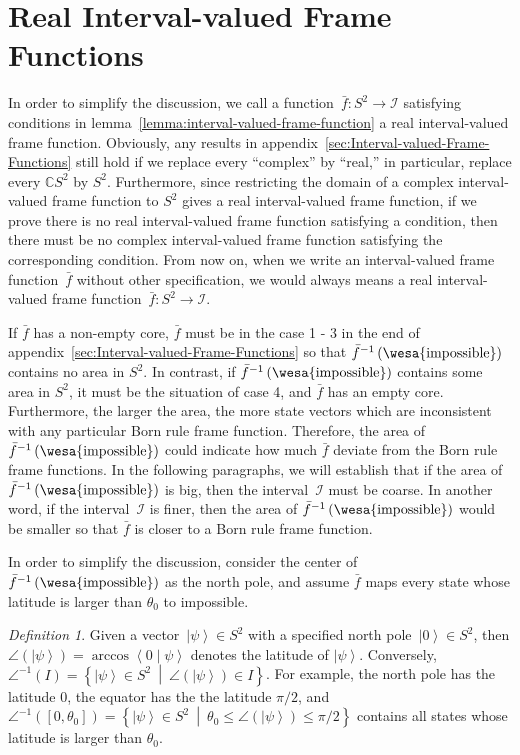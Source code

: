 \documentclass[12pt]{iopart}
\theoremstyle{remark}
\newtheorem{definition}{Definition}
\newcommand{\imposs}{{\mbox{\wesa{impossible}}}}
\newcommand{\ket}[1]{{\left\vert{#1}\right\rangle}}
\newcommand{\ip}[2]{\ensuremath{\left\langle{#1}\middle\vert{#2}\right\rangle}}
\newcommand{\set}[2]{\ensuremath{\left\{ {#1}~\middle|~{#2}\right\} }}
\begin{document}
\section{Real Interval-valued Frame Functions\label{sec:Real-Interval-valued-Frame}}

In order to simplify the discussion, we call a function~$\bar{f}:S^{2}\rightarrow\mathscr{I}$
satisfying conditions in lemma~\ref{lemma:interval-valued-frame-function}
a real interval-valued frame function. Obviously, any results in appendix~\ref{sec:Interval-valued-Frame-Functions}
still hold if we replace every ``complex'' by ``real,'' in particular,
replace every $\mathbb{C}S^{2}$ by $S^{2}$. Furthermore, since restricting
the domain of a complex interval-valued frame function to $S^{2}$
gives a real interval-valued frame function, if we prove there is
no real interval-valued frame function satisfying a condition, then
there must be no complex interval-valued frame function satisfying
the corresponding condition. From now on, when we write an interval-valued
frame function~$\bar{f}$ without other specification, we would always
means a real interval-valued frame function~$\bar{f}:S^{2}\rightarrow\mathscr{I}$.

If $\bar{f}$ has a non-empty core, $\bar{f}$ must be in the case
1 - 3 in the end of appendix~\ref{sec:Interval-valued-Frame-Functions}
so that $\bar{f}^{-1}\left(\imposs\right)$ contains no area in $S^{2}$.
In contrast, if $\bar{f}^{-1}\left(\imposs\right)$ contains some
area in $S^{2}$, it must be the situation of case 4, and $\bar{f}$
has an empty core. Furthermore, the larger the area, the more state
vectors which are inconsistent with any particular Born rule frame
function. Therefore, the area of $\bar{f}^{-1}\left(\imposs\right)$
could indicate how much $\bar{f}$ deviate from the Born rule frame
functions. In the following paragraphs, we will establish that if
the area of $\bar{f}^{-1}\left(\imposs\right)$ is big, then the interval~$\mathscr{I}$
must be coarse. In another word, if the interval~$\mathscr{I}$ is
finer, then the area of $\bar{f}^{-1}\left(\imposs\right)$ would
be smaller so that $\bar{f}$ is closer to a Born rule frame function.

In order to simplify the discussion, consider the center of $\bar{f}^{-1}\left(\imposs\right)$
as the north pole, and assume $\bar{f}$ maps every state whose latitude
is larger than $\theta_{0}$ to impossible.

\begin{definition}Given a vector~$\ket{\psi}\in S^{2}$ with a specified
north pole~$\ket{0}\in S^{2}$, then $\angle\left(\ket{\psi}\right)=\arccos\ip{0}{\psi}$
denotes the latitude of $\ket{\psi}$. Conversely, $\angle^{-1}\left(I\right)=\set{\ket{\psi}\in S^{2}}{\angle\left(\ket{\psi}\right)\in I}$.
For example, the north pole has the latitude $0$, the equator has
the the latitude $\pi / 2$, and $\angle^{-1}\left(\left[0,\theta_{0}\right]\right)=\set{\ket{\psi}\in S^{2}}{\theta_{0}\le\angle\left(\ket{\psi}\right)\le\pi / 2}$
contains all states whose latitude is larger than $\theta_{0}$.\end{definition}
\end{document}
